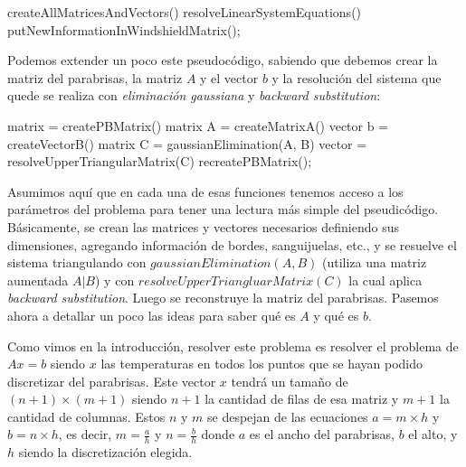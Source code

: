 \vspace{\baselineskip}
\begin{codebox}
\li createAllMatricesAndVectors()
\li resolveLinearSystemEquations()
\li putNewInformationInWindshieldMatrix();
\End
\end{codebox} 
\vspace{\baselineskip}
\par

Podemos extender un poco este pseudocódigo, sabiendo que debemos crear la matriz del parabrisas, la matriz $A$ y el vector $b$ y la resolución del sistema que quede se realiza con \textit{eliminación gaussiana} y \textit{backward substitution}:

\vspace{\baselineskip}
\begin{codebox}
\li matrix  = createPBMatrix()
\li matrix \id A = createMatrixA()
\li vector \id b = createVectorB()
\li matrix \id C = gaussianElimination(\id A, \id B)
\li vector  = resolveUpperTriangularMatrix(C)
\li recreatePBMatrix();
\End
\end{codebox} 
\vspace{\baselineskip}

Asumimos aquí que en cada una de esas funciones tenemos acceso a los parámetros del problema para tener una lectura más simple del pseudicódigo. Básicamente, se crean las matrices y vectores necesarios definiendo sus dimensiones, agregando información de bordes, sanguijuelas, etc., y se resuelve el sistema triangulando con $gaussianElimination(A,B)$ (utiliza una matriz aumentada $A|B$) y con $resolveUpperTriangluarMatrix(C)$ la cual aplica \textit{backward substitution}. Luego se reconstruye la matriz del parabrisas. Pasemos ahora a detallar un poco las ideas para saber qué es $A$ y qué es $b$.

\vspace{\baselineskip}

Como vimos en la introducción, resolver este problema es resolver el problema de $Ax = b$ siendo $x$ las temperaturas en todos los puntos que se hayan podido discretizar del parabrisas. Este vector $x$ tendrá un tamaño de $(n+1) \times (m+1)$ siendo $n+1$ la cantidad de filas de esa matriz y $m+1$ la cantidad de columnas. Estos $n$ y $m$ se despejan de las ecuaciones $a = m \times h$ y $b = n \times h$, es decir, $m = \frac{a}{h}$ y $n = \frac{b}{h}$ donde $a$ es el ancho del parabrisas, $b$ el alto, y $h$ siendo la discretización elegida. 


